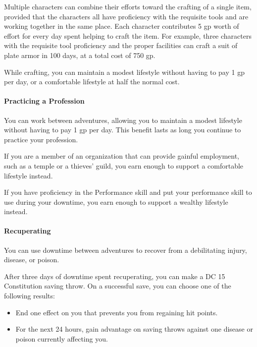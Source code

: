 \documentclass[
]{article}
\providecommand{\tightlist}{%
  \setlength{\itemsep}{0pt}\setlength{\parskip}{0pt}}
\begin{document}
Multiple characters can combine their efforts toward the crafting of a
single item, provided that the characters all have proficiency with the
requisite tools and are working together in the same place. Each
character contributes 5 gp worth of effort for every day spent helping
to craft the item. For example, three characters with the requisite tool
proficiency and the proper facilities can craft a suit of plate armor in
100 days, at a total cost of 750 gp.

While crafting, you can maintain a modest lifestyle without having to
pay 1 gp per day, or a comfortable lifestyle at half the normal cost.

\hypertarget{practicing-a-profession}{%
\paragraph{Practicing a Profession}\label{practicing-a-profession}}

You can work between adventures, allowing you to maintain a modest
lifestyle without having to pay 1 gp per day. This benefit lasts as long
you continue to practice your profession.

If you are a member of an organization that can provide gainful
employment, such as a temple or a thieves' guild, you earn enough to
support a comfortable lifestyle instead.

If you have proficiency in the Performance skill and put your
performance skill to use during your downtime, you earn enough to
support a wealthy lifestyle instead.

\hypertarget{recuperating}{%
\paragraph{Recuperating}\label{recuperating}}

You can use downtime between adventures to recover from a debilitating
injury, disease, or poison.

After three days of downtime spent recuperating, you can make a DC 15
Constitution saving throw. On a successful save, you can choose one of
the following results:

\begin{itemize}
\tightlist
\item
  End one effect on you that prevents you from regaining hit points.
\item
  For the next 24 hours, gain advantage on saving throws against one
  disease or poison currently affecting you.
\end{itemize}
\end{document}
